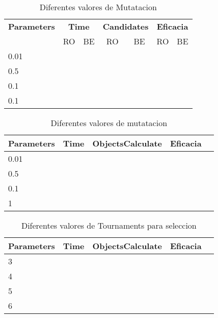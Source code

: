 \begin{table}[t!]
\centering
\begin{tabular}{l|cc|cc|cc}
\hline

\textbf{Parameters}& \multicolumn{2}{c}{\textbf{Time}} & \multicolumn{2}{c}{\textbf{Candidates}} & \multicolumn{2}{c}{\textbf{Eficacia}} \\
 &RO&BE&RO&BE&RO&BE \\

\hline

0.01 & &  &\\

0.5 & &  &\\
0.1 & &  &\\
0.1 & &  &\\
\midrule

\end{tabular}%
\caption{Diferentes valores de Mutatacion}
\label{tab:MutationGA}
\end{table}

\begin{table}[t!]
\centering
\begin{tabular}{l l ccc}
\hline

\textbf{Parameters}& \textbf{Time} & \textbf{ObjectsCalculate} & \textbf{Eficacia} \\
\midrule

0.01 & &  &\\

0.5 & &  &\\
0.1 & &  &\\
1 & &  &\\
\midrule

\end{tabular}%
\caption{Diferentes valores de mutatacion}
\label{tab:CrossOverGA}
\end{table}

\begin{table}[t!]
\centering
\begin{tabular}{l l ccc}
\hline

\textbf{Parameters}& \textbf{Time} & \textbf{ObjectsCalculate} & \textbf{Eficacia} \\
\midrule

3 & &  &\\

4 & &  &\\
5 & &  &\\
6 & &  &\\
\midrule

\end{tabular}%
\caption{Diferentes valores de Tournaments para seleccion}
\label{tab:SelectionGA}
\end{table}